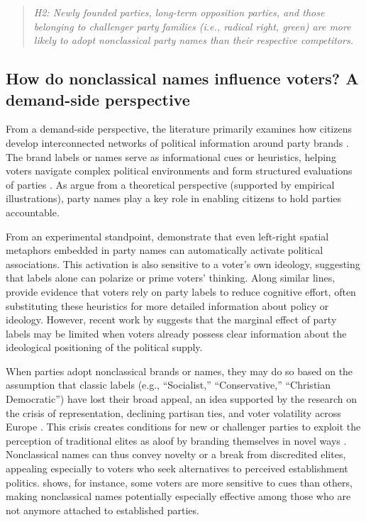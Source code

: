 \documentclass[12pt]{article}
\begin{document}
\begin{quote}
\textit{H2: Newly founded parties, long-term opposition parties, and those belonging to challenger party families (i.e., radical right, green) are more likely to adopt nonclassical party names than their respective competitors.}
\label{hyp:party_level}
\end{quote}

\subsection{How do nonclassical names influence voters? A demand-side perspective}

From a demand-side perspective, the literature primarily examines how citizens develop interconnected networks of political information around party brands \citep[e.g.,][]{John_Loken_Kim_Monga_2006, French_Smith_2010}. The brand labels or names serve as informational cues or heuristics, helping voters navigate complex political environments and form structured evaluations of parties \citep{Popkin_1994, Lau_Redlawsk_2001}. As \citet{Snyder_Ting_2002} argue from a theoretical perspective (supported by empirical illustrations), party names play a key role in enabling citizens to hold parties accountable.

From an experimental standpoint, \citet{van_Elk_2010} demonstrate that even left-right spatial metaphors embedded in party names can automatically activate political associations. This activation is also sensitive to a voter's own ideology, suggesting that labels alone can polarize or prime voters' thinking. Along similar lines, \citet{Lau_Redlawsk_2006} provide evidence that voters rely on party labels to reduce cognitive effort, often substituting these heuristics for more detailed information about policy or ideology. However, recent work by \citet{Titelman_Lauderdale_2025} suggests that the marginal effect of party labels may be limited when voters already possess clear information about the ideological positioning of the political supply.

When parties adopt nonclassical brands or names, they may do so based on the assumption that classic labels (e.g., ``Socialist,'' ``Conservative,'' ``Christian Democratic'') have lost their broad appeal, an idea supported by the research on the crisis of representation, declining partisan ties, and voter volatility across Europe \citep{Mair_2013, Dalton_Wattenberg_2000, Kirchheimer_1966, Katz_Mair_1995, Valgardsson_Jennings_Stoker_Bunting_Devine_McKay_Klassen_2025}. This crisis creates conditions for new or challenger parties to exploit the perception of traditional elites as aloof by branding themselves in novel ways \citep[][]{Mudde_2007, Van_Kessel_2015}. Nonclassical names can thus convey novelty or a break from discredited elites, appealing especially to voters who seek alternatives to perceived establishment politics. \citet{Kam_2005} shows, for instance, some voters are more sensitive to cues than others, making nonclassical names potentially especially effective among those who are not anymore attached to established parties.
\end{document}
